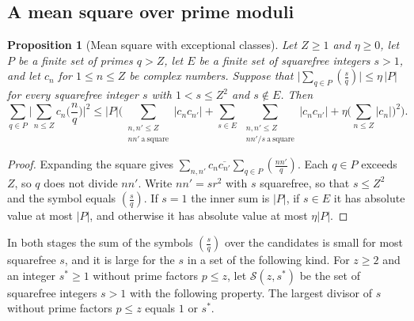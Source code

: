 \documentclass[11pt,letterpaper]{article}
\newtheorem{proposition}[theorem]{Proposition}
\numberwithin{equation}{section}
\begin{document}
\subsection{A mean square over prime moduli}

\begin{proposition}[Mean square with exceptional classes]\label{meansq}
Let $Z\ge1$ and $\eta\ge0$, let $P$ be a finite set of primes $q>Z$, let $E$ be a finite set of squarefree integers $s>1$, and let $c_n$ for $1\le n\le Z$ be complex numbers. Suppose that $\big|\sum_{q\in P}(\tfrac sq)\big|\le\eta\,|P|$ for every squarefree integer $s$ with $1<s\le Z^2$ and $s\notin E$. Then
\[
\sum_{q\in P}\Big|\sum_{n\le Z}c_n\Big(\frac nq\Big)\Big|^2\le|P|\Big(\sum_{\substack{n,n'\le Z\\ nn'\ \mathrm{a\ square}}}|c_nc_{n'}|+\sum_{s\in E}\ \sum_{\substack{n,n'\le Z\\ nn'/s\ \mathrm{a\ square}}}|c_nc_{n'}|+\eta\Big(\sum_{n\le Z}|c_n|\Big)^2\Big).
\]
\end{proposition}
\begin{proof}
Expanding the square gives $\sum_{n,n'}c_n\overline{c_{n'}}\sum_{q\in P}(\tfrac{nn'}q)$. Each $q\in P$ exceeds $Z$, so $q$ does not divide $nn'$. Write $nn'=sr^2$ with $s$ squarefree, so that $s\le Z^2$ and the symbol equals $(\tfrac sq)$. If $s=1$ the inner sum is $|P|$, if $s\in E$ it has absolute value at most $|P|$, and otherwise it has absolute value at most $\eta|P|$.
\end{proof}

In both stages the sum of the symbols $(\tfrac sq)$ over the candidates is small for most squarefree $s$, and it is large for the $s$ in a set of the following kind. For $z\ge2$ and an integer $s^\ast\ge1$ without prime factors $p\le z$, let $\mathcal S(z,s^\ast)$ be the set of squarefree integers $s>1$ with the following property. The largest divisor of $s$ without prime factors $p\le z$ equals $1$ or $s^\ast$.
\end{document}
